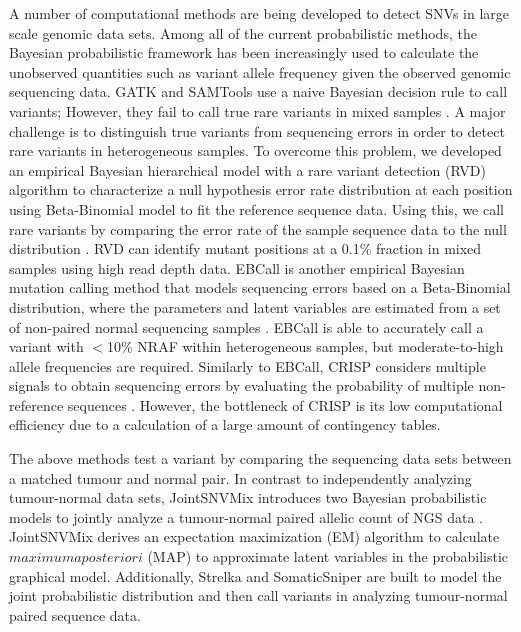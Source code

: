 \documentclass[11pt,reqno]{amsart}
\begin{document}
A number of computational methods are being developed to detect SNVs in large scale genomic data sets.
Among all of the current probabilistic methods, the Bayesian probabilistic framework has been increasingly used to calculate the unobserved quantities such as variant allele frequency given the observed genomic sequencing data.
GATK \citep{mckenna2010genome} and SAMTools \citep{li2009sequence} use a naive Bayesian decision rule to call variants;
However, they fail to call true rare variants in mixed samples \citep{he2015rvd2}.
A major challenge is to distinguish true variants from sequencing errors in order to detect rare variants in heterogeneous samples.
To overcome this problem, we developed an empirical Bayesian hierarchical model with a rare variant detection (RVD) algorithm to characterize a null hypothesis error rate distribution at each position using Beta-Binomial model to fit the reference sequence data. Using this, we call rare variants by comparing the error rate of the sample sequence data to the null distribution \citep{flaherty2011ultrasensitive}.
RVD can identify mutant positions at a 0.1\% fraction in mixed samples using high read depth data.
EBCall is another empirical Bayesian mutation calling method that models sequencing errors based on a Beta-Binomial distribution, where the parameters and latent variables are estimated from a set of non-paired normal sequencing samples \citep{shiraishi2013empirical}.
EBCall is able to accurately call a variant with $<$10\% NRAF within heterogeneous samples, but moderate-to-high allele frequencies are required.
Similarly to EBCall, CRISP considers multiple signals to obtain sequencing errors by evaluating the probability of multiple non-reference sequences \citep{bansal2010statistical}.
However, the bottleneck of CRISP is its low computational efficiency due to a calculation of a large amount of contingency tables.

The above methods test a variant by comparing the sequencing data sets between a matched tumour and normal pair.
In contrast to independently analyzing tumour-normal data sets, JointSNVMix introduces two Bayesian probabilistic models to jointly analyze a tumour-normal paired allelic count of NGS data \citep{roth2012jointsnvmix}.
JointSNVMix derives an expectation maximization (EM) algorithm to calculate $\mathit{maximum} \mathit{a} \mathit{posteriori}$ (MAP) to approximate latent variables in the probabilistic graphical model.
Additionally, Strelka \citep{saunders2012strelka} and SomaticSniper \citep{larson2012somaticsniper} are built to model the joint probabilistic distribution and then call variants in analyzing tumour-normal paired sequence data.
\end{document}

